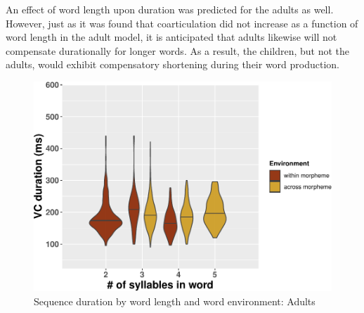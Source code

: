 \documentclass[
]{article}
\begin{document}
An effect of word length upon duration was predicted for the adults as well. However, just as it was found that coarticulation did not increase as a function of word length in the adult model, it is anticipated that adults likewise will not compensate durationally for longer words. As a result, the children, but not the adults, would exhibit compensatory shortening during their word production.

\begin{figure}
\centering
\includegraphics{3_ch3_results_files/figure-latex/compshort-adults-1.pdf}
\caption{\label{fig:compshort-adults}Sequence duration by word length and word environment: Adults}
\end{figure}
\end{document}
